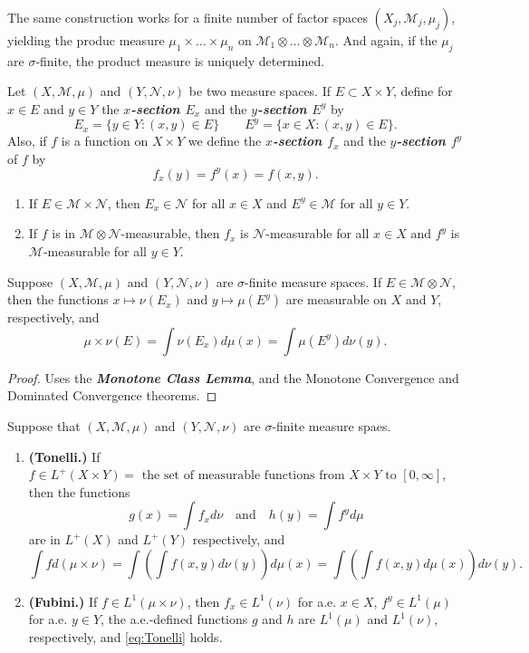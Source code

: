 \documentclass{article}
\theoremstyle{definition}
\numberwithin{equation}{section}
\begin{document}
	The same construction works for a finite number of factor spaces $(X_j,\mathcal{M}_j,\mu_j)$, yielding the produc measure $\mu_1\times\ldots\times\mu_n$ on $\mathcal{M}_1\otimes\ldots\otimes\mathcal{M}_n$. And again, if the $\mu_j$ are $\sigma$-finite, the product measure is uniquely determined.
	
	Let $(X,\mathcal{M},\mu)$ and $(Y,\mathcal{N},\nu)$ be two measure spaces. If $E\subset X\times Y$, define for $x\in E$ and $y\in Y$ the \textbf{\textit{$x$-section $E_x$}} and the \textbf{\textit{$y$-section $E^y$}} by
	\[E_x=\{y\in Y:(x,y)\in E\}\qquad E^y=\{x\in X:(x,y)\in E\}.\]
	Also, if $f$ is a function on $X\times Y$ we define the \textbf{\textit{$x$-section $f_x$}} and the \textbf{\textit{$y$-section $f^y$}} of $f$ by
	\[f_x(y)=f^y(x)=f(x,y).\]
	\begin{prop}\leavevmode
		\begin{enumerate}
			\item If $E\in \mathcal{M}\times\mathcal{N}$, then $E_x\in \mathcal{N}$ for all $x\in X$ and $E^y\in\mathcal{M}$ for all $y\in Y$.
			\item If $f$ is in $\mathcal{M}\otimes\mathcal{N}$-measurable, then $f_x$ is $\mathcal{N}$-measurable for all $x\in X$ and $f^y$ is $\mathcal{M}$-measurable for all $y\in Y$.
		\end{enumerate}
	\end{prop}
	\begin{thm}\label{thm:Fubini-Tonelli-previous}
		Suppose $(X,\mathcal{M},\mu)$ and $(Y,\mathcal{N},\nu)$ are $\sigma$-finite measure spaces. If $E\in\mathcal{M}\otimes\mathcal{N}$, then the functions $x\mapsto\nu(E_x)$ and $y\mapsto\mu(E^y)$ are measurable on $X$ and $Y$, respectively, and
		\[\mu\times\nu(E)=\int\nu(E_x)d\mu(x)=\int\mu(E^y)d\nu(y).\]
	\end{thm}
	\begin{proof}
		Uses the \textbf{\textit{Monotone Class Lemma}}, and the Monotone Convergence and Dominated Convergence theorems.
	\end{proof}
	\begin{thm} Suppose that $(X,\mathcal{M},\mu)$ and $(Y,\mathcal{N},\nu)$ are $\sigma$-finite measure spaes.
		\begin{enumerate}
			\item \textbf{(Tonelli.)} If $f\in L^+(X\times Y)=\text{ the set of measurable functions from }X\times Y\text{ to }[0,\infty]$, then the functions
			\[g(x)=\int f_xd\nu\quad\text{and}\quad h(y)=\int f^yd\mu\]
			are in $L^+(X)$ and $L^+(Y)$ respectively, and
			\begin{equation}\label{eq:Tonelli}
				\int fd(\mu\times\nu)=\int\left(\int f(x,y)d\nu(y)\right)d\mu(x)=\int\left(\int f(x,y)d\mu(x)\right)d\nu(y).
			\end{equation}
			\item \textbf{(Fubini.)} If $f\in L^1(\mu\times\nu)$, then $f_x\in L^1(\nu)$ for a.e. $x\in X$, $f^y\in L^1(\mu)$ for a.e. $y\in Y$, the a.e.-defined functions $g$ and $h$ are $L^1(\mu)$ and $L^1(\nu)$, respectively, and \cref{eq:Tonelli} holds.
		\end{enumerate}
	\end{thm}
\end{document}
